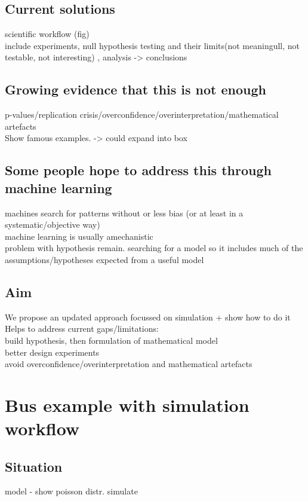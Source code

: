 \documentclass{article}
\begin{document}
			\subsection*{Current solutions}
			scientific workflow (fig)\\
			include experiments, null hypothesis testing and their limits(not meaningull, not testable, not interesting) , analysis -> conclusions\\
			\subsection*{Growing evidence that this is not enough}
			p-values/replication crisis/overconfidence/overinterpretation/mathematical artefacts\\
			Show famous examples. -> could expand into box\\
			\subsection*{Some people hope to address this through machine learning}
			machines search for patterns without or less bias (or at least in a systematic/objective way)\\
			machine learning is usually amechanistic\\
			problem with hypothesis remain. searching for a model so it includes much of the assumptions/hypotheses expected from a useful model\\
			\subsection*{Aim}
			We propose an updated approach focussed on simulation + show how to do it\\
			Helps to address current gaps/limitations:\\
			build hypothesis, then formulation of mathematical model\\
			better design experiments\\
			avoid overconfidence/overinterpretation and mathematical artefacts\\
			

\section{Bus example with simulation workflow}
	
	\subsection*{Situation}
	model - show poisson distr.
	simulate
\end{document}
